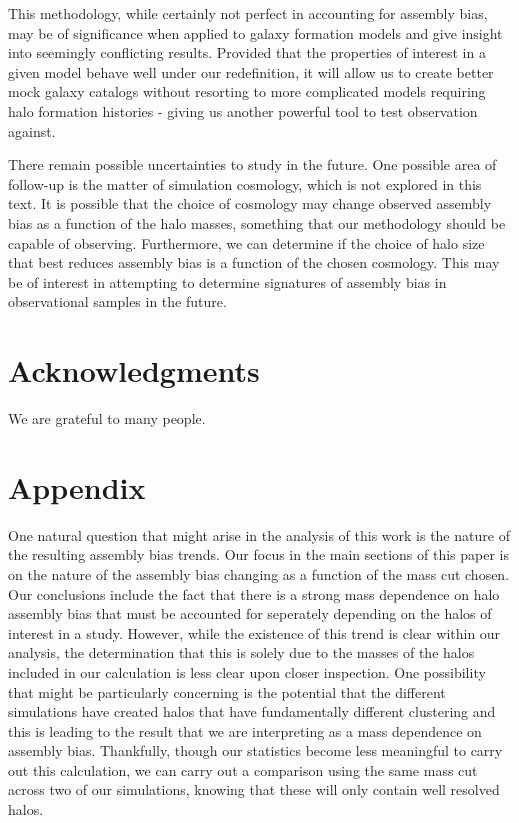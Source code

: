 \documentclass[usenatbib,usegraphicx,letterpaper]{mn2e}
\begin{document}
This methodology, while certainly not perfect in accounting for assembly bias, may be of significance when applied to galaxy formation models and give insight into seemingly conflicting results. Provided that the properties of interest in a given model behave well under our redefinition, it will allow us to create better mock galaxy catalogs without resorting to more complicated models requiring halo formation histories - giving us another powerful tool to test observation against.

There remain possible uncertainties to study in the future. One possible area of follow-up is the matter of simulation cosmology, which is not explored in this text. It is possible that the choice of cosmology may change observed assembly bias as a function of the halo masses, something that our methodology should be capable of observing. Furthermore, we can determine if the choice of halo size that best reduces assembly bias is a function of the chosen cosmology. This may be of interest in attempting to determine signatures of assembly bias in observational samples in the future.

\section*{Acknowledgments}

We are grateful to many people.



\section*{Appendix}
\label{section:appendix_massres}

One natural question that might arise in the analysis of this work is the nature of the resulting assembly bias trends. Our focus in the main sections of this paper is on the nature of the assembly bias changing as a function of the mass cut chosen. Our conclusions include the fact that there is a strong mass dependence on halo assembly bias that must be accounted for seperately depending on the halos of interest in a study. However, while the existence of this trend is clear within our analysis, the determination that this is solely due to the masses of the halos included in our calculation is less clear upon closer inspection. One possibility that might be particularly concerning is the potential that the different simulations have created halos that have fundamentally different clustering and this is leading to the result that we are interpreting as a mass dependence on assembly bias. Thankfully, though our statistics become less meaningful to carry out this calculation, we can carry out a comparison using the same mass cut across two of our simulations, knowing that these will only contain well resolved halos.
\end{document}

